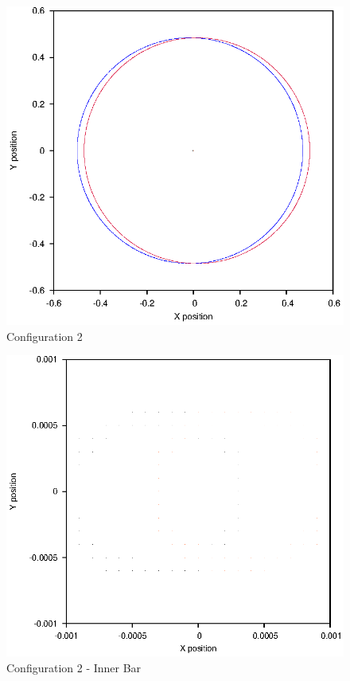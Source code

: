 \documentclass[a4paper,12pt]{article}
\begin{document}
\begin{figure}[H]
\centering
\includegraphics[width=.9\textwidth]{./2016results/002-5-001/Orbit.eps}
\caption{Configuration 2}
\label{fig:config2}
\end{figure}
\begin{figure}[H]
\centering
\includegraphics[width=.9\textwidth]{./2016results/002-5-001/Inner.eps}
\caption{Configuration 2 - Inner Bar}
\label{fig:config2i}
\end{figure}
\end{document}
